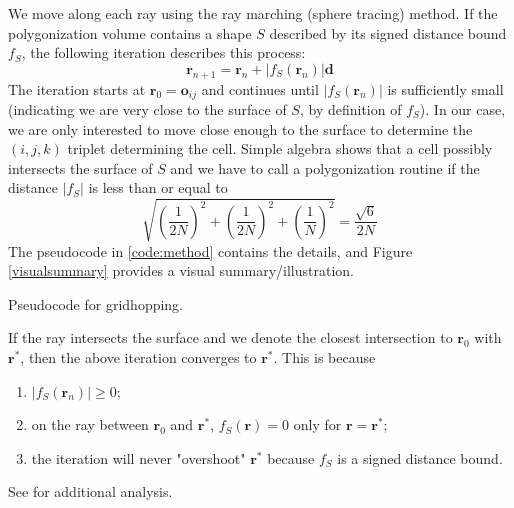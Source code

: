\documentclass[11pt,twocolumn]{article}
\begin{document}
		We move along each ray using the ray marching (sphere tracing) \cite{HartEtAl89rtfractals,Hart94spheretracing} method.
		If the polygonization volume contains a shape $S$ described by its signed distance bound $f_S$, the following iteration describes this process:
		\begin{equation}\label{eq:iter}
			\mathbf{r}_{n+1}=
			\mathbf{r}_n + \left|f_S(\mathbf{r}_n)\right|\mathbf{d}
		\end{equation}
		The iteration starts at $\mathbf{r}_0=\mathbf{o}_{ij}$ and continues until $\left|f_S(\mathbf{r}_n)\right|$ is sufficiently small
		(indicating we are very close to the surface of $S$, by definition of $f_S$).
		In our case, we are only interested to move close enough to the surface to determine the $(i, j, k)$ triplet determining the cell.
		Simple algebra shows that a cell possibly intersects the surface of $S$ and we have to call a polygonization routine if the distance $\left|f_S\right|$ is less than or equal to
		\begin{equation}
			\sqrt{
				\left(\frac{1}{2N}\right)^2 + \left(\frac{1}{2N}\right)^2 + \left(\frac{1}{N}\right)^2
			}=
			\frac{\sqrt{6}}{2N}
            \label{eq:polydist}
		\end{equation}
		The pseudocode in \ref{code:method} contains the details, and Figure \ref{visualsummary} provides a visual summary/illustration.
        \begin{algorithm}
			\label{code:method}
			\resizebox{0.52\textwidth}{!}
			{
				
			}
            \caption{Pseudocode for gridhopping.}
		\end{algorithm}

		If the ray intersects the surface and we denote the closest intersection to $\mathbf{r}_0$ with $\mathbf{r}^*$,
		then the above iteration converges to $\mathbf{r}^*$.
		This is because
		\begin{enumerate}
			\item
				$\left|f_S(\mathbf{r}_n)\right|\geq 0$;
			\item
				 on the ray between $\mathbf{r}_0$ and $\mathbf{r}^*$, $f_S(\mathbf{r})=0$ only for $\mathbf{r}=\mathbf{r}^*$;
			\item
				the iteration will never "overshoot" $\mathbf{r}^*$ because $f_S$ is a signed distance bound.
		\end{enumerate}
		See \cite{Hart94spheretracing} for additional analysis.
\end{document}
